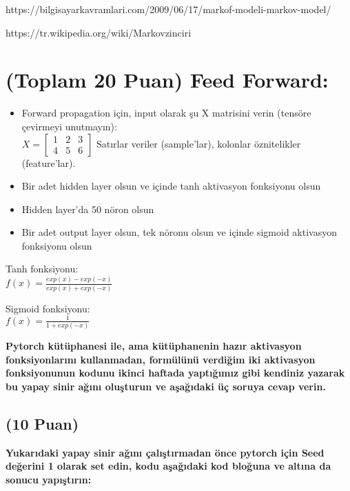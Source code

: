 \documentclass[11pt]{article}
\begin{document}
https://bilgisayarkavramlari.com/2009/06/17/markof-modeli-markov-model/

https://tr.wikipedia.org/wiki/Markovzinciri


\section{(Toplam 20 Puan) Feed Forward:}
 
\begin{itemize}
    \item Forward propagation için, input olarak şu X matrisini verin (tensöre çevirmeyi unutmayın):\\
    $X = \begin{bmatrix}
        1 & 2 & 3\\
        4 & 5 & 6
        \end{bmatrix}$
    Satırlar veriler (sample'lar), kolonlar öznitelikler (feature'lar).
    \item Bir adet hidden layer olsun ve içinde tanh aktivasyon fonksiyonu olsun
    \item Hidden layer'da 50 nöron olsun
    \item Bir adet output layer olsun, tek nöronu olsun ve içinde sigmoid aktivasyon fonksiyonu olsun
\end{itemize}

Tanh fonksiyonu:\\
$f(x) = \frac{exp(x) - exp(-x)}{exp(x) + exp(-x)}$
\vspace{.2in}

Sigmoid fonksiyonu:\\
$f(x) = \frac{1}{1 + exp(-x)}$

\vspace{.2in}
 \textbf{Pytorch kütüphanesi ile, ama kütüphanenin hazır aktivasyon fonksiyonlarını kullanmadan, formülünü verdiğim iki aktivasyon fonksiyonunun kodunu ikinci haftada yaptığımız gibi kendiniz yazarak bu yapay sinir ağını oluşturun ve aşağıdaki üç soruya cevap verin.}
 
\subsection{(10 Puan)} \textbf{Yukarıdaki yapay sinir ağını çalıştırmadan önce pytorch için Seed değerini 1 olarak set edin, kodu aşağıdaki kod bloğuna ve altına da sonucu yapıştırın:}
\end{document}
